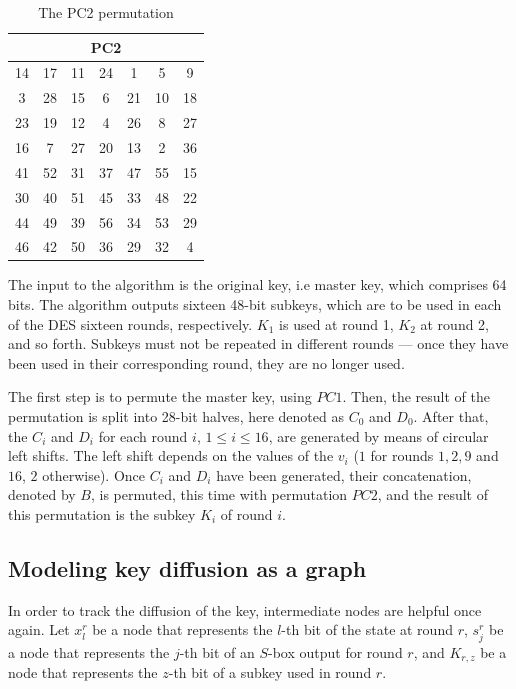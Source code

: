 \documentclass{report}
\begin{document}
\begin{table}[H]
\centering
\begin{tabular}{|c|c|c|c|c|c|c|}
\hline
\multicolumn{7}{|c|}{PC2}        \\ \hline
14 & 17 & 11 & 24 & 1  & 5  & 9  \\ \hline
3  & 28 & 15 & 6  & 21 & 10 & 18 \\ \hline
23 & 19 & 12 & 4  & 26 & 8  & 27 \\ \hline
16 & 7  & 27 & 20 & 13 & 2  & 36 \\ \hline
41 & 52 & 31 & 37 & 47 & 55 & 15 \\ \hline
30 & 40 & 51 & 45 & 33 & 48 & 22 \\ \hline
44 & 49 & 39 & 56 & 34 & 53 & 29 \\ \hline
46 & 42 & 50 & 36 & 29 & 32 & 4  \\ \hline
\end{tabular}
\caption{The PC2 permutation}
\label{tab:pc2}
\end{table}

The input to the algorithm is the original key, i.e master key, which comprises 64 bits. The algorithm outputs sixteen 48-bit subkeys, which are to be used in each of the DES sixteen rounds, respectively. $K_1$ is used at round 1, $K_2$ at round 2, and so forth. Subkeys must not be repeated in different rounds --- once they have been used in their corresponding round, they are no longer used.

The first step is to permute the master key, using $PC1$. Then, the result of the permutation is split into 28-bit halves, here denoted as $C_0$ and $D_0$. After that, the $C_i$ and $D_i$ for each round $i$, $1 \leq i \leq 16$, are generated by means of circular left shifts. The left shift depends on the values of the $v_i$ ($1$ for rounds $1, 2, 9$ and $16$, $2$ otherwise). Once $C_i$ and $D_i$ have been generated, their concatenation, denoted by $B$, is permuted, this time with permutation $PC2$, and the result of this permutation is the subkey $K_i$ of round $i$.

\subsection{Modeling key diffusion as a graph}
In order to track the diffusion of the key, intermediate nodes are helpful once again. Let $x^r_l$ be a node that represents the $l$-th bit of the state at round $r$, $s^r_j$ be a node that represents the $j$-th bit of an $S$-box output for round $r$, and $K_{r,z}$ be a node that represents the $z$-th bit of a subkey used in round $r$.
\end{document}
